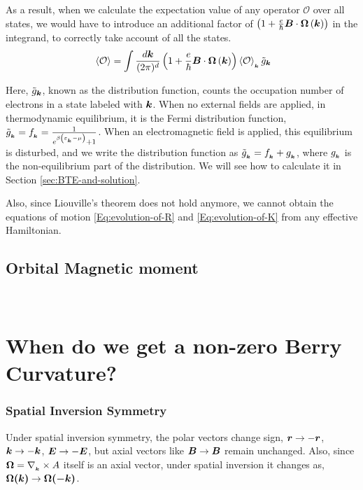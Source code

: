 \documentclass{report}
\renewcommand\vec[1]{\ensuremath\boldsymbol{#1}} %
\begin{document}
As a result, when we calculate the expectation value of any operator $\mathcal{O}$ over all states, we would have to introduce an additional factor of $\left(1 + \frac{e}{\hbar} \vec{B} \cdot \vec{\Omega}\left(\vec{k}\right)\right)$ in the integrand, to correctly take account of all the states.
\begin{equation}~\label{Eq:operator}
\expval{\mathcal{O}} = \int \frac{d\vec{k}}{(2\pi)^d} \left(1 + \frac{e}{\hbar} \vec{B} \cdot  \vec{\Omega}\left(\vec{k}\right)\right) \expval{\mathcal{O}}_{_{\vec{k}}} \tilde{g}_{\vec{k}}
\end{equation}

Here, $\tilde{g}_{\vec{k}}$, known as the distribution function, counts the occupation number of electrons in a state labeled with $\vec{k}$. When no external fields are applied, in thermodynamic equilibrium, it is the Fermi distribution function, $\tilde{g}_{_{\vec{k}}} = f_{_{\vec{k}}} = \frac{1}{e^{\beta \left(\varepsilon_{_{\vec{k}}} - \mu \right)} + 1}$. When an electromagnetic field is applied, this equilibrium is disturbed, and we write the distribution function as $\tilde{g}_{_{\vec{k}}} = f_{_{\vec{k}}} + g_{_{\vec{k}}}$, where $g_{_{\vec{k}}}$ is the non-equilibrium part of the distribution. We will see how to calculate it in Section \ref{sec:BTE-and-solution}.

Also, since Liouville's theorem does not hold anymore, we cannot obtain the equations of motion \eqref{Eq:evolution-of-R} and \eqref{Eq:evolution-of-K} from any effective Hamiltonian. 

\section{Orbital Magnetic moment}~\label{sec:OrbMagMom}
\chapter{When do we get a non-zero Berry Curvature?}
\subsection{Spatial Inversion Symmetry}
Under spatial inversion symmetry, the polar vectors change sign, $\vec{r} \rightarrow -\vec{r}$, $\vec{k} \rightarrow -\vec{k}$, $\vec{E} \rightarrow -\vec{E}$, but axial vectors like $\vec{B} \rightarrow \vec{B}$ remain unchanged. Also, since $\vec{\Omega} = \nabla_{_{\vec{k}}} \times A$ itself is an axial vector, under spatial inversion it changes as, $\vec{\Omega(\vec{k})} \rightarrow \vec{\Omega(\vec{-k})}$.
\end{document}
